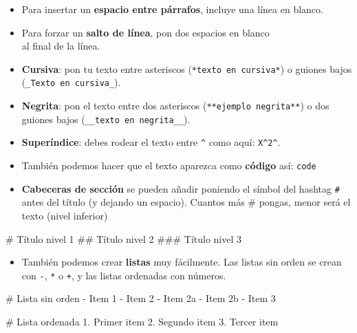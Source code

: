 \documentclass[
  letterpaper,
  DIV=11,
  numbers=noendperiod]{scrreprt}
\newenvironment{Shaded}{\begin{snugshade}}{\end{snugshade}}
\newcommand{\FunctionTok}[1]{\textcolor[rgb]{0.28,0.35,0.67}{#1}}
\newcommand{\NormalTok}[1]{\textcolor[rgb]{0.00,0.23,0.31}{#1}}
\newcommand{\SpecialStringTok}[1]{\textcolor[rgb]{0.13,0.47,0.30}{#1}}
\providecommand{\tightlist}{%
  \setlength{\itemsep}{0pt}\setlength{\parskip}{0pt}}\usepackage{longtable,booktabs,array}
\begin{document}
\begin{itemize}
\item
  Para insertar un \textbf{espacio entre párrafos}, incluye una línea en
  blanco.
\item
  Para forzar un \textbf{salto de línea}, pon dos espacios en blanco\\
  al final de la línea.
\item
  \textbf{Cursiva}: pon tu texto entre asteriscos
  (\texttt{*texto\ en\ cursiva*}) o guiones bajos
  (\texttt{\_Texto\ en\ cursiva\_}).
\item
  \textbf{Negrita}: pon el texto entre dos asteriscos
  (\texttt{**ejemplo\ negrita**}) o dos guiones bajos
  (\texttt{\_\_texto\ en\ negrita\_\_}).
\item
  \textbf{Superíndice}: debes rodear el texto entre \texttt{\^{}} como
  aquí: \texttt{X\^{}2\^{}}.
\item
  También podemos hacer que el texto aparezca como \textbf{código} así:
  \texttt{code}
\item
  \textbf{Cabeceras de sección} se pueden añadir poniendo el símbol del
  hashtag \texttt{\#} antes del título (y dejando un espacio). Cuantos
  más \# pongas, menor será el texto (nivel inferior)
\end{itemize}

\begin{Shaded}
\begin{Highlighting}[]
\NormalTok{ \# Título nivel 1}
\NormalTok{ \#\# Título nivel 2}
\NormalTok{ \#\#\# Título nivel 3}
\end{Highlighting}
\end{Shaded}

\begin{itemize}
\tightlist
\item
  También podemos crear \textbf{listas} muy fácilmente. Las listas sin
  orden se crean con \texttt{-}, \texttt{*} o \texttt{+}, y las listas
  ordenadas con números.
\end{itemize}

\begin{Shaded}
\begin{Highlighting}[]
\FunctionTok{\# Lista sin orden}
\SpecialStringTok{{-} }\NormalTok{Item 1}
\SpecialStringTok{{-} }\NormalTok{Item 2}
\SpecialStringTok{    {-} }\NormalTok{Item 2a}
\SpecialStringTok{    {-} }\NormalTok{Item 2b}
\SpecialStringTok{{-} }\NormalTok{Item 3}


\FunctionTok{\# Lista ordenada}
\SpecialStringTok{1. }\NormalTok{Primer item}
\SpecialStringTok{2. }\NormalTok{Segundo item}
\SpecialStringTok{3. }\NormalTok{Tercer item}
\end{Highlighting}
\end{Shaded}
\end{document}
